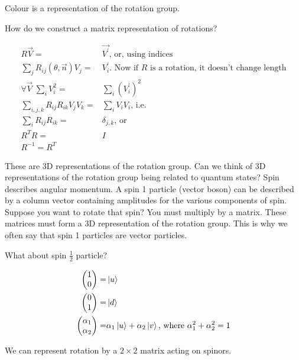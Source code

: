 \documentclass[]{article}
\begin{document}
Colour is a representation of the rotation group.

How do we construct a matrix representation of rotations? 

\begin{align*}
	R \vec{V} =&\vec{V^\prime} \text{, or, using indices}\\
	\sum_j R_{ij}(\theta,\vec{n})V_j=&V_i^\prime  \text{. Now if $R$ is a rotation, it doesn't change length}\\
	\forall \vec{V} \; \sum_i V_i^2 =& \sum_i (V_i^\prime)^2\\
	\sum_{i,j,k} R_{ij} R_{ik} V_j V_k =& \sum_i V_i V_i \text{, i.e.}\\
	\sum_{i} R_{ij} R_{ik} =& \delta_{j,k} \text{, or}\\
	R^T R =& I\\
	R^{-1} = R^T
\end{align*}

These are 3D representations of the rotation group. Can we think of 3D representations of the rotation group being related to quantum states? Spin describes angular momentum. A spin 1 particle (vector boson) can be described by a column vector containing amplitudes for the various components of spin. Suppose you want to rotate that spin? You must multiply by a matrix. These matrices must form a 3D representation of the rotation group. This is why we often say that spin 1 particles are vector particles.

What about spin $\frac{1}{2}$ particle?

\begin{align*}
	\begin{pmatrix}
		1\\
		0
	\end{pmatrix}=& \ket{u}\\
	\begin{pmatrix}
		0\\
		1
	\end{pmatrix}=& \ket{d}\\
	\begin{pmatrix}
		\alpha_1\\
		\alpha_2
	\end{pmatrix}=& \alpha_1 \ket{u} + \alpha_2 \ket{v} \text{, where $\alpha_1^2+\alpha_2^2=1$}
\end{align*}

We can represent rotation by a $2\times2$ matrix acting on spinors.
\end{document}
